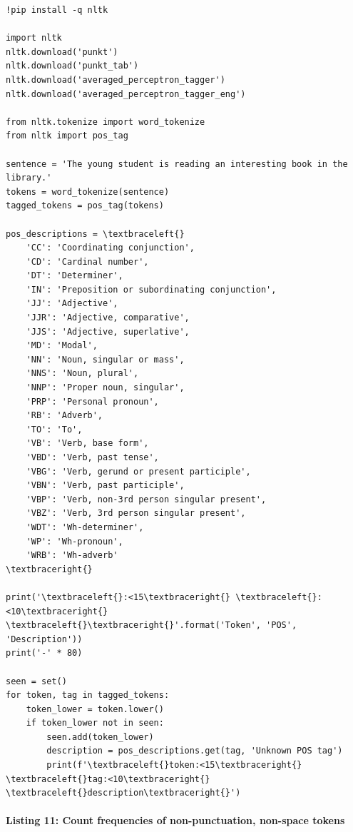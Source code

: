 \documentclass[12pt,a4paper,oneside]{report}
\begin{document}
\begin{Verbatim}[commandchars=\\\{\},breaklines=true,breakanywhere=true,fontsize=\scriptsize,frame=leftline,framesep=2mm,rulecolor=\color{gray}]
!pip install -q nltk

import nltk
nltk.download('punkt')
nltk.download('punkt_tab')
nltk.download('averaged_perceptron_tagger')
nltk.download('averaged_perceptron_tagger_eng')

from nltk.tokenize import word_tokenize
from nltk import pos_tag

sentence = 'The young student is reading an interesting book in the library.'
tokens = word_tokenize(sentence)
tagged_tokens = pos_tag(tokens)

pos_descriptions = \textbraceleft{}
    'CC': 'Coordinating conjunction',
    'CD': 'Cardinal number',
    'DT': 'Determiner',
    'IN': 'Preposition or subordinating conjunction',
    'JJ': 'Adjective',
    'JJR': 'Adjective, comparative',
    'JJS': 'Adjective, superlative',
    'MD': 'Modal',
    'NN': 'Noun, singular or mass',
    'NNS': 'Noun, plural',
    'NNP': 'Proper noun, singular',
    'PRP': 'Personal pronoun',
    'RB': 'Adverb',
    'TO': 'To',
    'VB': 'Verb, base form',
    'VBD': 'Verb, past tense',
    'VBG': 'Verb, gerund or present participle',
    'VBN': 'Verb, past participle',
    'VBP': 'Verb, non-3rd person singular present',
    'VBZ': 'Verb, 3rd person singular present',
    'WDT': 'Wh-determiner',
    'WP': 'Wh-pronoun',
    'WRB': 'Wh-adverb'
\textbraceright{}

print('\textbraceleft{}:<15\textbraceright{} \textbraceleft{}:<10\textbraceright{} \textbraceleft{}\textbraceright{}'.format('Token', 'POS', 'Description'))
print('-' * 80)

seen = set()
for token, tag in tagged_tokens:
    token_lower = token.lower()
    if token_lower not in seen:
        seen.add(token_lower)
        description = pos_descriptions.get(tag, 'Unknown POS tag')
        print(f'\textbraceleft{}token:<15\textbraceright{} \textbraceleft{}tag:<10\textbraceright{} \textbraceleft{}description\textbraceright{}')
\end{Verbatim}
\paragraph{Listing 11: Count frequencies of non-punctuation, non-space tokens}\mbox{}\\[-1ex]
\end{document}
